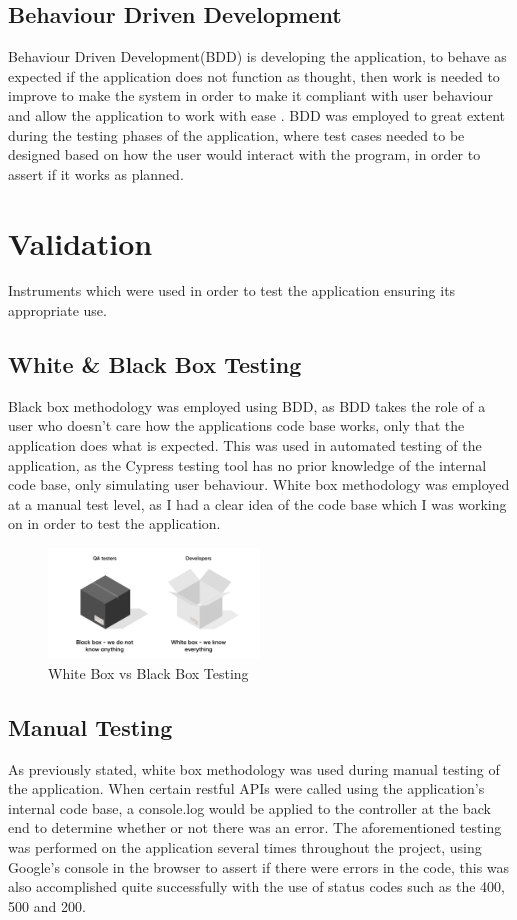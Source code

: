\subsection{Behaviour Driven Development}
Behaviour Driven Development(BDD) is developing the application, to behave as expected if the application does not function as thought, then work is needed to improve to make the system in order to make it compliant with user behaviour and allow the application to work with ease \cite{abushama2020effect}. BDD was employed to great extent during the testing phases of the application, where test cases needed to be designed based on how the user would interact with the program, in order to assert if it works as planned.

\section{Validation}
Instruments which were used in order to test the application ensuring its appropriate use.

\subsection{White \& Black Box Testing}
Black box methodology was employed using BDD, as BDD takes the role of a user who doesn't care how the applications code base works, only that the application does what is expected. This was used in automated testing of the application, as the Cypress testing tool has no prior knowledge of the internal code base, only simulating user behaviour. White box methodology was employed at a manual test level, as I had a clear idea of the code base which I was working on in order to test the application.

\begin{figure}[h!]
    \centering
    \includegraphics[width=0.5\textwidth]{images/WhiteAndBlack.jpg}
    \caption{White Box vs Black Box Testing}
    \label{image:WhiteAndBlackBox}
\end{figure}

\subsection{Manual Testing}
As previously stated, white box methodology was used during manual testing of the application. When certain restful APIs were called using the application's internal code base, a console.log would be applied to the controller at the back end to determine whether or not there was an error. The aforementioned testing was performed on the application several times throughout the project, using Google's console in the browser to assert if there were errors in the code, this was also accomplished quite successfully with the use of status codes such as the 400, 500 and 200.

